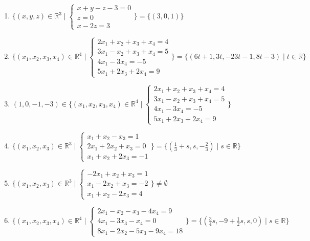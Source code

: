 \documentclass[11pt,a4paper]{article}
\begin{document}
\begin{enumerate}
\item $\displaystyle \{(x, y, z) \in \mathbb{R}^{3} \mid \begin{cases} x + y - z - 3 = 0 \\ z = 0 \\ x - 2z = 3 \end{cases}\} = \{(3, 0, 1)\}$
\item $\displaystyle \{(x_{1}, x_{2}, x_{3}, x_{4}) \in \mathbb{R}^{4} \mid \begin{cases} 2x_{1} + x_{2} + x_{3} + x_{4} = 4 \\ 3x_{1} - x_{2} + x_{3} + x_{4} = 5 \\ 4x_{1} - 3x_{4} = -5 \\ 5x_{1} + 2x_{3} + 2x_{4} = 9 \end{cases}\} = \{(6t + 1, 3t, -23t - 1, 8t - 3) \mid t \in \mathbb{R}\}$
\item $\displaystyle (1, 0, -1, -3) \in \{(x_{1}, x_{2}, x_{3}, x_{4}) \in \mathbb{R}^{4} \mid \begin{cases} 2x_{1} + x_{2} + x_{3} + x_{4} = 4 \\ 3x_{1} - x_{2} + x_{3} + x_{4} = 5 \\ 4x_{1} - 3x_{4} = -5 \\ 5x_{1} + 2x_{3} + 2x_{4} = 9 \end{cases}\}$
\item $\displaystyle \{(x_{1}, x_{2}, x_{3}) \in \mathbb{R}^{3} \mid \begin{cases} x_{1} + x_{2} - x_{3} = 1 \\ 2x_{1} + 2x_{2} + x_{3} = 0 \\ x_{1} + x_{2} + 2x_{3} = -1 \end{cases}\} = \{(\frac{1}{3} + s, s, -\frac{2}{3}) \mid s \in \mathbb{R}\}$
\item $\displaystyle \{(x_{1}, x_{2}, x_{3}) \in \mathbb{R}^{3} \mid \begin{cases} -2x_{1} + x_{2} + x_{3} = 1 \\ x_{1} - 2x_{2} + x_{3} = -2 \\ x_{1} + x_{2} - 2x_{3} = 4 \end{cases}\} \neq \emptyset$
\item $\displaystyle \{(x_{1}, x_{2}, x_{3}, x_{4}) \in \mathbb{R}^{4} \mid \begin{cases} 2x_{1} - x_{2} - x_{3} - 4x_{4} = 9 \\ 4x_{1} - 3x_{3} - x_{4} = 0 \\ 8x_{1} - 2x_{2} - 5x_{3} - 9x_{4} = 18 \end{cases}\} = \{(\frac{3}{4} s, -9 + \frac{1}{2} s, s, 0) \mid s \in \mathbb{R}\}$

\end{enumerate}
\end{document}
